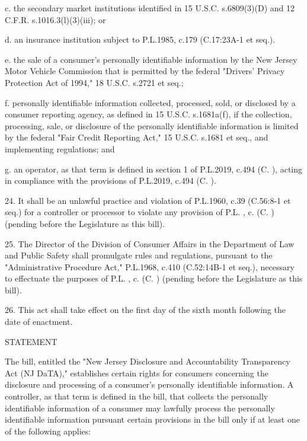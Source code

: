      c.     the secondary market institutions identified in 15 U.S.C. s.6809(3)(D) and 12 C.F.R. s.1016.3(l)(3)(iii); or

     d.    an insurance institution subject to P.L.1985, c.179 (C.17:23A-1 et seq.).

     e.     the sale of a consumer's personally identifiable information by the New Jersey Motor Vehicle Commission that is permitted by the federal "Drivers' Privacy Protection Act of 1994," 18 U.S.C. s.2721 et seq.;

     f.     personally identifiable information collected, processed, sold, or disclosed by a consumer reporting agency, as defined in 15 U.S.C. s.1681a(f), if the collection, processing, sale, or disclosure of the personally identifiable information is limited by the federal "Fair Credit Reporting Act," 15 U.S.C. s.1681 et seq., and implementing regulations; and

     g.    an operator, as that term is defined in section 1 of P.L.2019, c.494 (C.      ), acting in compliance with the provisions of P.L.2019, c.494 (C.      ).

 

     24.  It shall be an unlawful practice and violation of P.L.1960, c.39 (C.56:8-1 et seq.) for a controller or processor to violate any provision of P.L.    , c.    (C.      ) (pending before the Legislature as this bill).

 

     25.  The Director of the Division of Consumer Affairs in the Department of Law and Public Safety shall promulgate rules and regulations, pursuant to the "Administrative Procedure Act," P.L.1968, c.410 (C.52:14B-1 et seq.), necessary to effectuate the purposes of P.L.      , c.   (C.    ) (pending before the Legislature as this bill).

 

     26.  This act shall take effect on the first day of the sixth month following the date of enactment.

 

 

STATEMENT

 

     The bill, entitled the "New Jersey Disclosure and Accountability Transparency Act (NJ DaTA)," establishes certain rights for consumers concerning the disclosure and processing of a consumer's personally identifiable information. A controller, as that term is defined in the bill, that collects the personally identifiable information of a consumer may lawfully process the personally identifiable information pursuant certain provisions in the bill only if at least one of the following applies:

